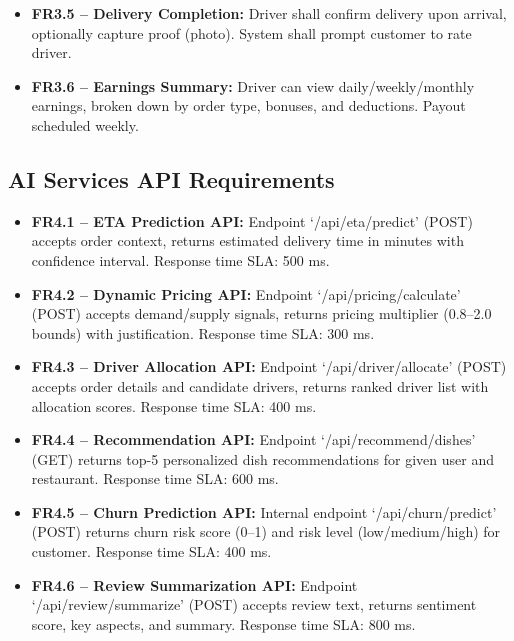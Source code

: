 \documentclass[12pt,a4paper]{report}
\begin{document}
\begin{itemize}
\begin{itemize}
    \item \textbf{FR3.5 -- Delivery Completion:} Driver shall confirm delivery upon arrival, optionally capture proof (photo). System shall prompt customer to rate driver.
    
    \item \textbf{FR3.6 -- Earnings Summary:} Driver can view daily/weekly/monthly earnings, broken down by order type, bonuses, and deductions. Payout scheduled weekly.
\end{itemize}

\subsection{AI Services API Requirements}

\begin{itemize}
    \item \textbf{FR4.1 -- ETA Prediction API:} Endpoint `/api/eta/predict' (POST) accepts order context, returns estimated delivery time in minutes with confidence interval. Response time SLA: 500 ms.
    
    \item \textbf{FR4.2 -- Dynamic Pricing API:} Endpoint `/api/pricing/calculate' (POST) accepts demand/supply signals, returns pricing multiplier (0.8--2.0 bounds) with justification. Response time SLA: 300 ms.
    
    \item \textbf{FR4.3 -- Driver Allocation API:} Endpoint `/api/driver/allocate' (POST) accepts order details and candidate drivers, returns ranked driver list with allocation scores. Response time SLA: 400 ms.
    
    \item \textbf{FR4.4 -- Recommendation API:} Endpoint `/api/recommend/dishes' (GET) returns top-5 personalized dish recommendations for given user and restaurant. Response time SLA: 600 ms.
    
    \item \textbf{FR4.5 -- Churn Prediction API:} Internal endpoint `/api/churn/predict' (POST) returns churn risk score (0--1) and risk level (low/medium/high) for customer. Response time SLA: 400 ms.
    
    \item \textbf{FR4.6 -- Review Summarization API:} Endpoint `/api/review/summarize' (POST) accepts review text, returns sentiment score, key aspects, and summary. Response time SLA: 800 ms.
\end{itemize}


\end{itemize}
\end{document}
